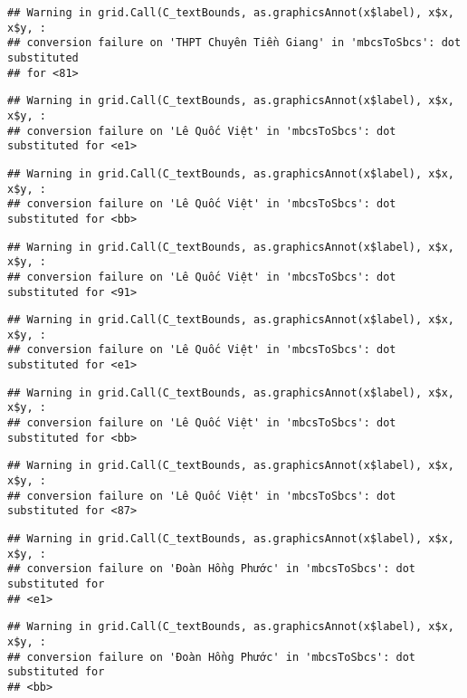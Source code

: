 \documentclass[
]{article}
\begin{document}
\begin{verbatim}
## Warning in grid.Call(C_textBounds, as.graphicsAnnot(x$label), x$x, x$y, :
## conversion failure on 'THPT Chuyên Tiền Giang' in 'mbcsToSbcs': dot substituted
## for <81>
\end{verbatim}

\begin{verbatim}
## Warning in grid.Call(C_textBounds, as.graphicsAnnot(x$label), x$x, x$y, :
## conversion failure on 'Lê Quốc Việt' in 'mbcsToSbcs': dot substituted for <e1>
\end{verbatim}

\begin{verbatim}
## Warning in grid.Call(C_textBounds, as.graphicsAnnot(x$label), x$x, x$y, :
## conversion failure on 'Lê Quốc Việt' in 'mbcsToSbcs': dot substituted for <bb>
\end{verbatim}

\begin{verbatim}
## Warning in grid.Call(C_textBounds, as.graphicsAnnot(x$label), x$x, x$y, :
## conversion failure on 'Lê Quốc Việt' in 'mbcsToSbcs': dot substituted for <91>
\end{verbatim}

\begin{verbatim}
## Warning in grid.Call(C_textBounds, as.graphicsAnnot(x$label), x$x, x$y, :
## conversion failure on 'Lê Quốc Việt' in 'mbcsToSbcs': dot substituted for <e1>
\end{verbatim}

\begin{verbatim}
## Warning in grid.Call(C_textBounds, as.graphicsAnnot(x$label), x$x, x$y, :
## conversion failure on 'Lê Quốc Việt' in 'mbcsToSbcs': dot substituted for <bb>
\end{verbatim}

\begin{verbatim}
## Warning in grid.Call(C_textBounds, as.graphicsAnnot(x$label), x$x, x$y, :
## conversion failure on 'Lê Quốc Việt' in 'mbcsToSbcs': dot substituted for <87>
\end{verbatim}

\begin{verbatim}
## Warning in grid.Call(C_textBounds, as.graphicsAnnot(x$label), x$x, x$y, :
## conversion failure on 'Đoàn Hồng Phước' in 'mbcsToSbcs': dot substituted for
## <e1>
\end{verbatim}

\begin{verbatim}
## Warning in grid.Call(C_textBounds, as.graphicsAnnot(x$label), x$x, x$y, :
## conversion failure on 'Đoàn Hồng Phước' in 'mbcsToSbcs': dot substituted for
## <bb>
\end{verbatim}
\end{document}

